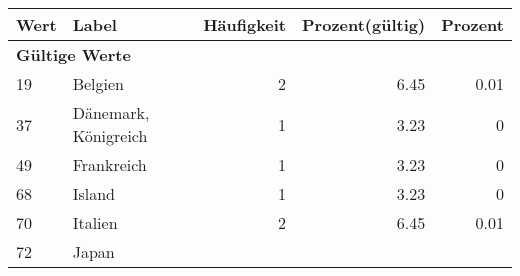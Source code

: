      \begin{longtable}{lXrrr}
     \toprule
     \textbf{Wert} & \textbf{Label} & \textbf{Häufigkeit} & \textbf{Prozent(gültig)} & \textbf{Prozent} \\
     \endhead
     \midrule
     \multicolumn{5}{l}{\textbf{Gültige Werte}}\\

     19 &
     \multicolumn{1}{X}{ Belgien   } &


       \num{2} &
       \num[round-mode=places,round-precision=2]{6,45} &
         \num[round-mode=places,round-precision=2]{0,01} \\

     37 &
     \multicolumn{1}{X}{ Dänemark, Königreich   } &


       \num{1} &
       \num[round-mode=places,round-precision=2]{3,23} &
         \num[round-mode=places,round-precision=2]{0} \\

     49 &
     \multicolumn{1}{X}{ Frankreich   } &


       \num{1} &
       \num[round-mode=places,round-precision=2]{3,23} &
         \num[round-mode=places,round-precision=2]{0} \\

     68 &
     \multicolumn{1}{X}{ Island   } &


       \num{1} &
       \num[round-mode=places,round-precision=2]{3,23} &
         \num[round-mode=places,round-precision=2]{0} \\

     70 &
     \multicolumn{1}{X}{ Italien   } &


       \num{2} &
       \num[round-mode=places,round-precision=2]{6,45} &
         \num[round-mode=places,round-precision=2]{0,01} \\

     72 &
     \multicolumn{1}{X}{ Japan   } &



\end{longtable}

